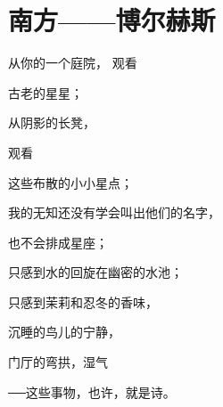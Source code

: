 \section{南方——博尔赫斯}

从你的一个庭院， 观看

古老的星星；

从阴影的长凳，

观看

这些布散的小小星点；

我的无知还没有学会叫出他们的名字，

也不会排成星座；

只感到水的回旋在幽密的水池；

只感到茉莉和忍冬的香味，

沉睡的鸟儿的宁静，

门厅的弯拱，湿气

──这些事物，也许，就是诗。

